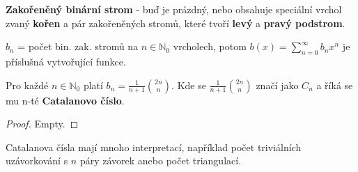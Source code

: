 \textbf{Zakořeněný binární strom} - buď je prázdný, nebo obsahuje speciální vrchol zvaný \textbf{kořen} a pár zakořeněných stromů, které tvoří \textbf{levý} a \textbf{pravý podstrom}.

$b_{n}$ = počet bin. zak. stromů na $n \in \mathbb{N}_{0}$ vrcholech, potom $b(x) = \sum_{n = 0}^{\infty}b_{n} x^{n}$ je příslušná vytvořující funkce.

\begin{veta}
	Pro každé $n \in \mathbb{N}_{0}$ platí $b_{n}=\frac{1}{n+1}\binom{2n}{n}$. Kde se $\frac{1}{n+1}\binom{2n}{n}$ značí jako $C_n$ a říká se mu n-té \textbf{Catalanovo číslo}.
\end{veta}

\begin{proof}
	Empty.
\end{proof}

Catalanova čísla mají mnoho interpretací, například počet triviálních uzávorkování s $n$ páry závorek anebo počet triangulací.
